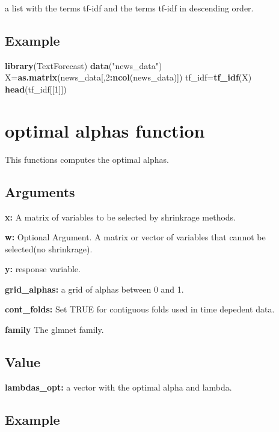 \documentclass[]{article}
\newenvironment{Shaded}{\begin{snugshade}}{\end{snugshade}}
\newcommand{\KeywordTok}[1]{\textcolor[rgb]{0.13,0.29,0.53}{\textbf{#1}}}
\newcommand{\DecValTok}[1]{\textcolor[rgb]{0.00,0.00,0.81}{#1}}
\newcommand{\StringTok}[1]{\textcolor[rgb]{0.31,0.60,0.02}{#1}}
\newcommand{\OperatorTok}[1]{\textcolor[rgb]{0.81,0.36,0.00}{\textbf{#1}}}
\newcommand{\NormalTok}[1]{#1}
\begin{document}
a list with the terms tf-idf and the terms tf-idf in descending order.

\subsection{Example}\label{example-3}

\begin{Shaded}
\begin{Highlighting}[]
\KeywordTok{library}\NormalTok{(TextForecast)}
 \KeywordTok{data}\NormalTok{(}\StringTok{"news_data"}\NormalTok{)}
\NormalTok{ X=}\KeywordTok{as.matrix}\NormalTok{(news_data[,}\DecValTok{2}\OperatorTok{:}\KeywordTok{ncol}\NormalTok{(news_data)])}
\NormalTok{  tf_idf=}\KeywordTok{tf_idf}\NormalTok{(X)}
  \KeywordTok{head}\NormalTok{(tf_idf[[}\DecValTok{1}\NormalTok{]])}
\end{Highlighting}
\end{Shaded}

\section{optimal alphas function}\label{optimal-alphas-function}

This functions computes the optimal alphas.

\subsection{Arguments}\label{arguments-4}

\textbf{x:} A matrix of variables to be selected by shrinkrage methods.

\textbf{w:} Optional Argument. A matrix or vector of variables that
cannot be selected(no shrinkrage).

\textbf{y:} response variable.

\textbf{grid\_alphas:} a grid of alphas between 0 and 1.

\textbf{cont\_folds:} Set TRUE for contiguous folds used in time
depedent data.

\textbf{family} The glmnet family.

\subsection{Value}\label{value-4}

\textbf{lambdas\_opt:} a vector with the optimal alpha and lambda.

\subsection{Example}\label{example-4}
\end{document}
